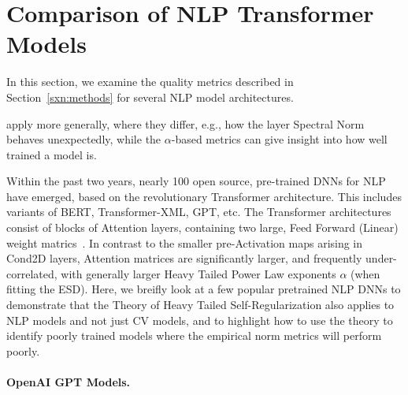 \section{Comparison of NLP Transformer Models}
\label{sxn:nlp}





In this section, we examine the quality metrics described in Section~\ref{sxn:methods} for several NLP model architectures.


apply more generally, where they differ, e.g., how the layer Spectral Norm behaves unexpectedly, while the $\alpha$-based metrics can give insight into how well trained a model is.



Within the past two years, nearly 100 open source, pre-trained DNNs for NLP have emerged, based on the revolutionary Transformer architecture.
This includes variants of BERT, Transformer-XML, GPT, etc.
The Transformer architectures consist of blocks of Attention layers, containing two large, Feed Forward (Linear) weight matrics~\cite{Attn2017}. 
In contrast to the smaller pre-Activation maps arising in Cond2D layers, Attention matrices are significantly larger, 
and frequently under-correlated, with generally larger Heavy Tailed Power Law exponents $\alpha$ (when fitting the ESD).  
Here, we breifly look at a few popular pretrained NLP DNNs to demonstrate that the Theory of Heavy Tailed Self-Regularization also
applies to NLP models and not just CV models, and to highlight how to use the theory to identify
poorly trained models where the empirical norm metrics will perform poorly.

\paragraph{OpenAI GPT Models.}

